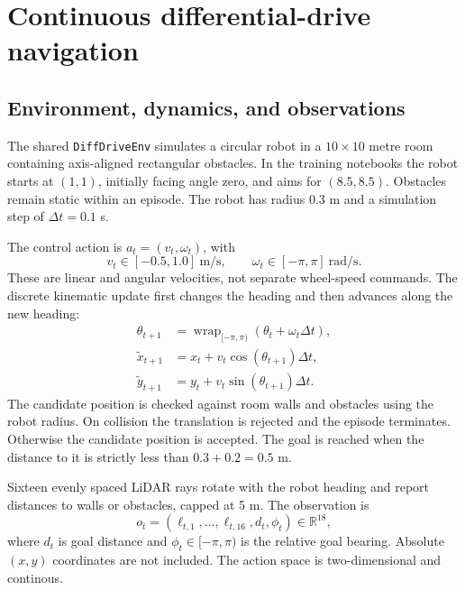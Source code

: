 \documentclass[11pt,a4paper]{article}
\theoremstyle{definition}
\theoremstyle{plain}
\theoremstyle{remark}
\newcommand{\code}[1]{\texttt{#1}}
\newcommand{\R}{\mathbb{R}}
\begin{document}
\section{Continuous differential-drive navigation}
\label{sec:continuous}

\subsection{Environment, dynamics, and observations}

The shared \code{DiffDriveEnv} simulates a circular robot in a $10\times10$ metre room containing axis-aligned rectangular obstacles. In the training notebooks the robot starts at $(1,1)$, initially facing angle zero, and aims for $(8.5,8.5)$. Obstacles remain static within an episode. The robot has radius $0.3$ m and a simulation step of $\Delta t=0.1$ s.

The control action is $a_t=(v_t,\omega_t)$, with
\begin{equation}
 v_t\in[-0.5,1.0]\ \mathrm{m/s},\qquad
 \omega_t\in[-\pi,\pi]\ \mathrm{rad/s}.
\end{equation}
These are linear and angular velocities, not separate wheel-speed commands. The discrete kinematic update first changes the heading and then advances along the new heading:
\begin{align}
 \theta_{t+1}&=\operatorname{wrap}_{[-\pi,\pi)}(\theta_t+\omega_t\Delta t),\\
 \widetilde x_{t+1}&=x_t+v_t\cos(\theta_{t+1})\Delta t,\\
 \widetilde y_{t+1}&=y_t+v_t\sin(\theta_{t+1})\Delta t.
 \label{eq:kinematics}
\end{align}
The candidate position is checked against room walls and obstacles using the robot radius. On collision the translation is rejected and the episode terminates. Otherwise the candidate position is accepted. The goal is reached when the distance to it is strictly less than $0.3+0.2=0.5$ m.

Sixteen evenly spaced LiDAR rays rotate with the robot heading and report distances to walls or obstacles, capped at 5 m. The observation is
\begin{equation}
 o_t=(\ell_{t,1},\ldots,\ell_{t,16},d_t,\phi_t)\in\R^{18},
 \label{eq:observation}
\end{equation}
where $d_t$ is goal distance and $\phi_t\in[-\pi,\pi)$ is the relative goal bearing. Absolute $(x,y)$ coordinates are not included. The action space is two-dimensional and continous.
\end{document}
